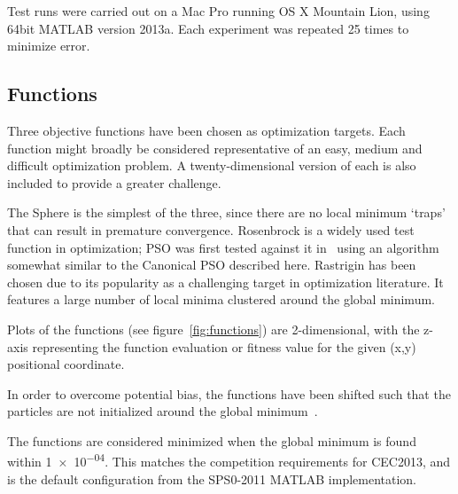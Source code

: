 \documentclass{csfourzero}
\begin{document}
Test runs were carried out on a Mac Pro running OS X Mountain Lion, using
64bit MATLAB version 2013a. Each experiment was repeated 25 times to minimize
error.

\subsection{Functions}

Three objective functions have been chosen as optimization targets. Each
function might broadly be considered representative of an easy, medium and
difficult optimization problem. A twenty-dimensional version of each is also
included to provide a greater challenge.

The Sphere is the simplest of the three, since there are no local minimum
`traps' that can result in premature convergence. Rosenbrock is a widely used
test function in optimization; PSO was first tested against it
in~\cite{Shi:1999je} using an algorithm somewhat similar to the Canonical PSO
described here.  Rastrigin has been chosen due to its popularity as a
challenging target in optimization literature. It features a large number of
local minima clustered around the global minimum.

Plots of the functions (see figure~\ref{fig:functions}) are 2-dimensional, with
the z-axis representing the function evaluation or fitness value for the given
(x,y) positional coordinate.

In order to overcome potential bias, the functions have been shifted such that
the particles are not initialized around the global
minimum~\cite{Monson:2005fn}.

The functions are considered minimized when the global minimum is found within
\num{1e-04}. This matches the competition requirements for CEC2013, and is the
default configuration from the SPS0-2011 MATLAB implementation.
\end{document}
